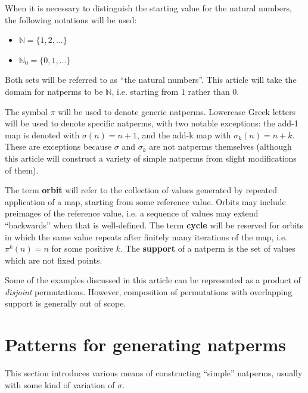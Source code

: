\documentclass[12pt,reqno]{article}
\begin{document}
When it is necessary to distinguish the starting value for the natural numbers, the following notations will be used: \begin{itemize} 
  \item $\mathbb{N} = \{ 1, 2, \ldots \}$
  \item $\mathbb{N}_0 = \{ 0, 1, \ldots \}$
\end{itemize}
Both sets will be referred to as ``the natural numbers''. This article will take the domain for natperms to be $\mathbb{N}$, i.e. starting from $1$ rather than $0$.

The symbol $\pi$ will be used to denote generic natperms. Lowercase Greek letters will be used to denote specific natperms, with two notable exceptions: the add-1 map is denoted with $\sigma(n) = n + 1$, and the add-k map with $\sigma_k(n) = n + k$. These are exceptions because $\sigma$ and $\sigma_k$ are not natperms themselves (although this article will construct a variety of simple natperms from slight modifications of them).

The term \textbf{orbit} will refer to the collection of values generated by repeated application of a map, starting from some reference value. Orbits may include preimages of the reference value, i.e. a sequence of values may extend ``backwards'' when that is well-defined. The term \textbf{cycle} will be reserved for orbits in which the same value repeats after finitely many iterations of the map, i.e. $\pi^k(n) = n$ for some positive $k$. The \textbf{support} of a natperm is the set of values which are not fixed points. 


Some of the examples discussed in this article can be represented as a product of \textit{disjoint} permutations. However, composition of permutations with overlapping support is generally out of scope.

\section{Patterns for generating natperms}

This section introduces various means of constructing ``simple'' natperms, usually with some kind of variation of $\sigma$.
\end{document}
